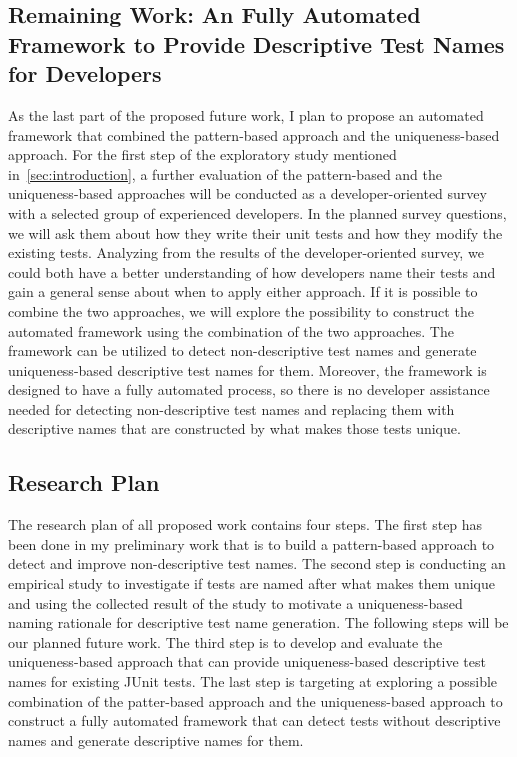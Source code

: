 \subsection{Remaining Work: An Fully Automated Framework to Provide Descriptive Test Names for Developers}
\label{sec:remaining-work2}

As the last part of the proposed future work, I plan to propose an automated framework that combined the pattern-based approach and the uniqueness-based approach.
%
For the first step of the exploratory study mentioned in~\cref{sec:introduction}, a further evaluation of the pattern-based and the uniqueness-based approaches will be conducted as a developer-oriented survey with a selected group of experienced developers.
%
In the planned survey questions, we will ask them about how they write their unit tests and how they modify the existing tests.
%
Analyzing from the results of the developer-oriented survey, we could both have a better understanding of how developers name their tests and gain a general sense about when to apply either approach.
%
If it is possible to combine the two approaches, we will explore the possibility to construct the automated framework using the combination of the two approaches.
%
The framework can be utilized to detect non-descriptive test names and generate uniqueness-based descriptive test names for them.
%
Moreover, the framework is designed to have a fully automated process, so there is no developer assistance needed for detecting non-descriptive test names and replacing them with descriptive names that are constructed by what makes those tests unique.


\subsection{Research Plan}

The research plan of all proposed work contains four steps.
%
The first step has been done in my preliminary work that is to build a pattern-based approach to detect and improve non-descriptive test names.
%
The second step is conducting an empirical study to investigate if tests are named after what makes them unique and using the collected result of the study to motivate a uniqueness-based naming rationale for descriptive test name generation.
%
The following steps will be our planned future work.
%
The third step is to develop and evaluate the uniqueness-based approach that can provide uniqueness-based descriptive test names for existing JUnit tests.
%
The last step is targeting at exploring a possible combination of the patter-based approach and the uniqueness-based approach to construct a fully automated framework that can detect tests without descriptive names and generate descriptive names for them.